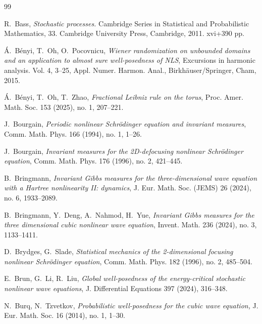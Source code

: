 \documentclass[letterpaper, 11pt,  reqno]{amsart}
\newcommand{\1}{\hspace{0.5mm}\text{I}\hspace{0.2mm}}
\numberwithin{equation}{section}
\numberwithin{theorem}{section}
\begin{document}
\begin{thebibliography}{99}









%
%


R.~Bass, 
{\it Stochastic processes.}
Cambridge Series in Statistical and Probabilistic Mathematics, 33. Cambridge University Press, Cambridge, 2011. xvi+390 pp. 


\'A.~B\'enyi, T.~Oh, O.~Pocovnicu, 
{\it Wiener randomization on unbounded domains and an application to almost sure well-posedness of NLS}, Excursions in harmonic analysis. Vol. 4, 3--25, Appl. Numer. Harmon. Anal., Birkh\"auser/Springer, Cham, 2015. 

\'A.~B\'enyi, T.~Oh, T.~Zhao,
{\it Fractional Leibniz rule on the torus}, 
Proc. Amer. Math. Soc. 153 (2025), no. 1, 207--221.


J.~Bourgain,
{\it Periodic nonlinear Schr\"odinger equation and invariant measures}, 
Comm. Math. Phys. 166 (1994), no. 1, 1--26.


J.~Bourgain,
{\it Invariant measures for the 2D-defocusing nonlinear Schr\"odinger equation}, 
Comm. Math. Phys. 176 (1996), no. 2, 421--445.


B.~Bringmann,
{\it Invariant Gibbs measures for the three-dimensional wave equation with a Hartree nonlinearity II: dynamics}, 
J. Eur. Math. Soc. (JEMS) 26 (2024), no. 6, 1933--2089.


B.~Bringmann, Y.~Deng, A.~Nahmod, H.~Yue,
{\it Invariant Gibbs measures for the three dimensional cubic nonlinear wave equation}, 
Invent. Math. 236 (2024), no. 3, 1133--1411.



D.~Brydges, G.~Slade,
{\it 
Statistical mechanics of the 2-dimensional focusing nonlinear Schr\"odinger equation}, 
Comm. Math. Phys.
182 (1996), no. 2, 485--504.


E.~Brun, G.~Li, R.~Liu,
{\it Global well-posedness of the energy-critical stochastic nonlinear wave equations}, 
J. Differential Equations 397 (2024), 316--348.


N.~Burq, N.~Tzvetkov, 
{\it Probabilistic well-posedness for the cubic wave equation,} J. Eur. Math. Soc. 16 (2014), no. 1, 1--30. 







\end{thebibliography}
\end{document}
